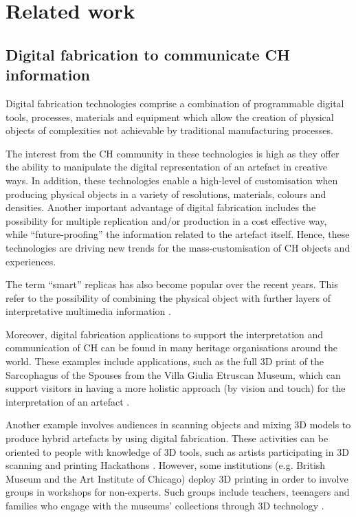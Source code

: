 \documentclass[acmlarge,screen]{acmart}
\begin{document}
\section{Related work}
\label{related}
\subsection{Digital fabrication to communicate CH information}
Digital fabrication technologies comprise a combination of programmable digital tools, processes, materials and equipment which allow the creation of physical objects of complexities not achievable by traditional manufacturing processes. 

The interest from the CH community in these technologies is high as they offer the ability to manipulate the digital representation of an artefact in creative ways. In addition, these technologies enable a high-level of customisation when producing physical objects in a variety of resolutions, materials, colours and densities. Another important advantage of digital fabrication includes the possibility for multiple replication and/or production in a cost effective way, while ``future-proofing'' the information related to the artefact itself. Hence, these technologies are driving new trends for the mass-customisation of CH objects and experiences.   

The term ``smart'' replicas has also become popular over the recent years. This refer to the possibility of combining the physical object with further layers of interpretative multimedia information \cite{Capurro2015,Marshall2016}. 

Moreover, digital fabrication applications to support the interpretation and communication of CH can be found in many heritage organisations around the world. These examples include applications, such as the full 3D print of the Sarcophagus of the Spouses from the Villa Giulia Etruscan Museum, which can support visitors in having a more holistic approach (by vision and touch) for the interpretation of an artefact \cite{Guidazzoli2014}.

Another example involves audiences in scanning objects and mixing 3D models to produce hybrid artefacts by using digital fabrication. These activities can be oriented to people with knowledge of 3D tools, such as artists participating in 3D scanning and printing Hackathons \cite{Mullaney2012,Neely2013}. However, some institutions (e.g. British Museum and the Art Institute of Chicago) deploy 3D printing in order to involve groups in workshops for non-experts. Such groups include teachers, teenagers and families who engage with the museums' collections through 3D technology \cite{BritishMuseum2016,Neely2015,Miles2015}.  
\end{document}
